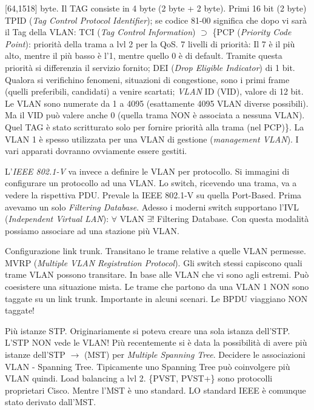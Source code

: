 [64,1518] byte. Il TAG consiste in 4 byte (2 byte + 2 byte). Primi 16 bit (2 byte) TPID (\textit{Tag Control Protocol Identifier}); se codice 81-00 significa che dopo vi sarà il Tag della VLAN: TCI (\textit{Tag Control Information}) $\supset$ \{PCP (\textit{Priority Code Point}): priorità della trama a lvl 2 per la QoS. 7 livelli di priorità: Il 7 è il più alto, mentre il più basso è l'1, mentre quello 0 è di default. Tramite questa priorità si differenzia il servizio fornito; DEI (\textit{Drop Eligible Indicator}) di 1 bit. Qualora si verifichino fenomeni, situazioni di congestione, sono i primi frame (quelli preferibili, candidati) a venire scartati; \textit{VLAN} ID (VID), valore di 12 bit. Le VLAN sono numerate da 1 a 4095 (esattamente 4095 VLAN diverse possibili). Ma il VID può valere anche 0 (quella trama NON è associata a nessuna VLAN). Quel TAG è stato scritturato solo per fornire priorità alla trama (nel PCP)\}. La VLAN 1 è spesso utilizzata per una VLAN di gestione (\textit{management VLAN}). I vari apparati dovranno ovviamente essere gestiti.

L'\textit{IEEE 802.1-V} va invece a definire le VLAN per protocollo. Si immagini di configurare un protocollo ad una VLAN. Lo switch, ricevendo una trama, va a vedere la rispettiva PDU. Prevale la IEEE 802.1-V su quella Port-Based. Prima avevamo un solo \textit{Filtering Database}. Adesso i moderni switch supportano l'IVL (\textit{Independent Virtual LAN}): $\forall$ VLAN $\exists!$ Filtering Database. Con questa modalità possiamo associare ad una stazione più VLAN.

Configurazione link trunk. Transitano le trame relative a quelle VLAN permesse. MVRP (\textit{Multiple VLAN Registration Protocol}). Gli switch stessi capiscono quali trame VLAN possono transitare. In base alle VLAN che vi sono agli estremi. Può coesistere una situazione mista. Le trame che partono da una VLAN 1 NON sono taggate su un link trunk. Importante in alcuni scenari. Le BPDU viaggiano NON taggate! 

Più istanze STP. Originariamente si poteva creare una sola istanza dell'STP. L'STP NON vede le VLAN! Più recentemente si è data la possibilità di avere più istanze dell'STP $\rightarrow$ (MST) per \textit{Multiple Spanning Tree}. Decidere le associazioni VLAN - Spanning Tree. Tipicamente uno Spanning Tree può coinvolgere più VLAN quindi. Load balancing a lvl 2. \{PVST, PVST+\} sono protocolli proprietari Cisco. Mentre l'MST è uno standard. LO standard IEEE è comunque stato derivato dall'MST.

